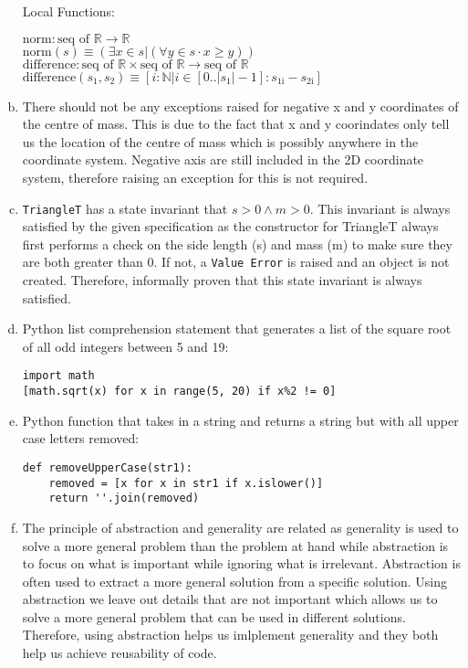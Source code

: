 \documentclass[12pt]{article}
\begin{document}
\begin{enumerate}[a)]
Local Functions: 

\noindent $\text{norm}: \text{seq of } \mathbb{R} \rightarrow \mathbb{R} $\\
\noindent $\text{norm}(s) \equiv (\exists x \in s | (\forall y \in s \cdot x \ge y))$\\

\noindent $\text{difference}: \text{seq of } \mathbb{R} \times \text{seq of } \mathbb{R} \rightarrow \text{seq of } \mathbb{R} $\\
\noindent $\text{difference}(s_1, s_2) \equiv [i: \mathbb{N} | i \in [0..|s_1|-1]: s_\text{1i} - s_\text{2i}]$\\


\item There should not be any exceptions raised for negative x and y coordinates of the centre of mass. This is due to the fact that x and y coorindates only tell us the location of the centre of mass which is possibly anywhere in the coordinate system. Negative axis are still included in the 2D coordinate system, therefore raising an exception for this is not required.


\item \texttt{TriangleT} has a state invariant that $s > 0 \wedge m > 0$. This invariant is always satisfied by the given specification as the constructor for TriangleT always first performs a check on the side length (s) and mass (m) to make sure they are both greater than 0. If not, a \texttt{Value Error} is raised and an object is not created. Therefore, informally proven that this state invariant is always satisfied.

\item Python list comprehension statement that generates a list of the square root of all odd integers between 5 and 19: 
\begin{verbatim}
import math
[math.sqrt(x) for x in range(5, 20) if x%2 != 0]
\end{verbatim}

\item Python function that takes in a string and returns a string but with all upper case letters removed:
\begin{verbatim}
def removeUpperCase(str1):
    removed = [x for x in str1 if x.islower()]
    return ''.join(removed)
\end{verbatim}

\item The principle of abstraction and generality are related as generality is used to solve a more general problem than the problem at hand while abstraction is to focus on what is important while ignoring what is irrelevant. Abstraction is often used to extract a more general solution from a specific solution. Using abstraction we leave out details that are not important which allows us to solve a more general problem that can be used in different solutions. Therefore, using abstraction helps us imlplement generality and they both help us achieve reusability of code. 


\end{enumerate}
\end{document}

